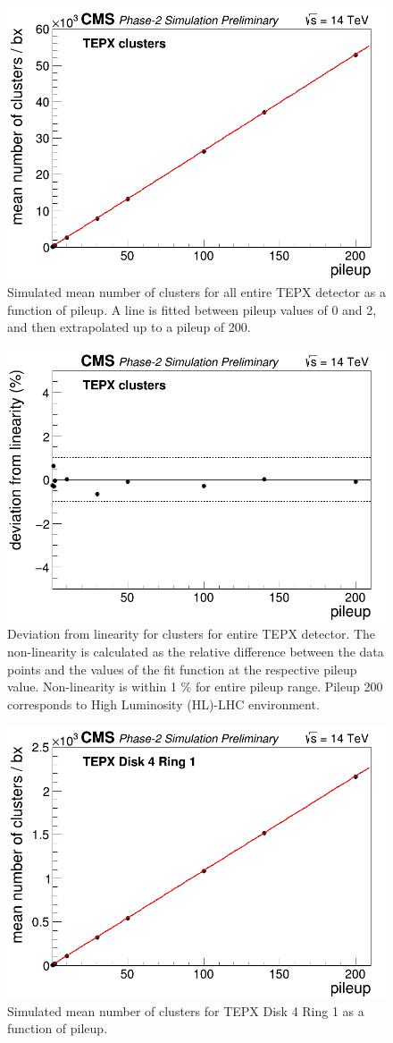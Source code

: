 \begin{figure}[H]
  \centering
  \includegraphics[width=0.5\columnwidth]{./TEPX_totalcluster_linearity.png}
  \caption{Simulated mean number of clusters for all entire TEPX detector as a function of pileup. A line is fitted between pileup values of 0 and 2, and then extrapolated up to a pileup of 200.}
  \label{fig:CMS}
\end{figure}


\begin{figure}[H]
  \centering
  \includegraphics[width=0.5\columnwidth]{./TEPX_totalcluster_residuals.png}
  \caption{Deviation from linearity for clusters for entire TEPX detector. The non-linearity is calculated as the relative difference between the data points and the values of the fit function at the respective pileup value. Non-linearity is within 1 \% for entire pileup range. Pileup 200 corresponds to High Luminosity (HL)-LHC environment.}
  \label{fig:CMS}
\end{figure}



\begin{figure}[H]
  \centering
  \includegraphics[width=0.5\columnwidth]{./TEPX_Disk_4_Ring_1_mean_number_of_clusters___bx_Linearity.png}
  \caption{Simulated mean number of clusters for TEPX Disk 4 Ring 1 as a function of pileup.}
  \label{fig:CMS}
\end{figure}




